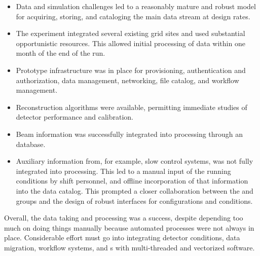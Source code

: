\begin{itemize}
    \item Data and simulation challenges led to a reasonably mature and robust model for acquiring, storing, and cataloging the main data stream at design rates.
    \item The experiment integrated several existing grid sites and used substantial opportunistic resources.  This allowed initial processing of data within one month of the end of the run.
    \item Prototype infrastructure was in place for provisioning, authentication and authorization, data management, networking, file catalog, and workflow management. 
    \item Reconstruction algorithms were available, permitting immediate studies of detector performance and calibration. 
    \item Beam information was successfully integrated into processing through %
    an  database.
    \item Auxiliary information from, for example, slow control systems, was not fully integrated into processing. This led to a manual input of the running conditions by shift personnel, and offline incorporation of that information into the data catalog. This prompted a closer collaboration between the  and  groups and the design of robust interfaces for configurations and conditions. 
\end{itemize}

Overall, the  data taking and processing was a success, despite depending too much on doing things manually because automated processes were not always in place. Considerable effort must go into integrating detector conditions, data migration, workflow systems, and s with multi-threaded and vectorized software.



